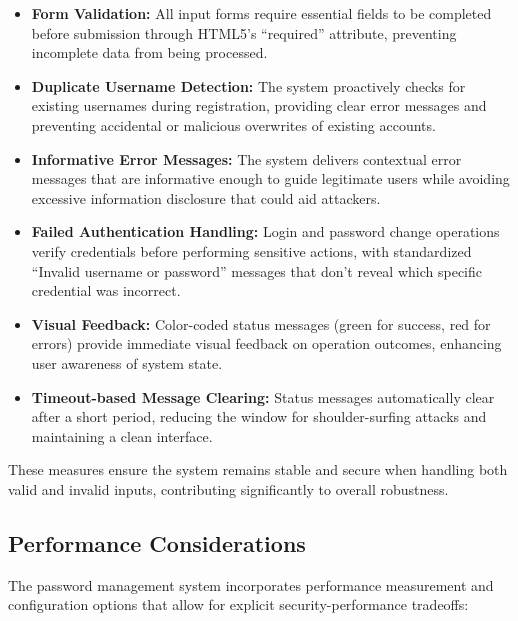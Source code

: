 \documentclass[11pt,a4paper]{article}
\begin{document}
\begin{itemize}
   \item \textbf{Form Validation:} All input forms require essential fields to be completed before submission through HTML5's ``required'' attribute, preventing incomplete data from being processed.
   
   \item \textbf{Duplicate Username Detection:} The system proactively checks for existing usernames during registration, providing clear error messages and preventing accidental or malicious overwrites of existing accounts.
   
   \item \textbf{Informative Error Messages:} The system delivers contextual error messages that are informative enough to guide legitimate users while avoiding excessive information disclosure that could aid attackers.
   
   \item \textbf{Failed Authentication Handling:} Login and password change operations verify credentials before performing sensitive actions, with standardized ``Invalid username or password'' messages that don't reveal which specific credential was incorrect.
   
   \item \textbf{Visual Feedback:} Color-coded status messages (green for success, red for errors) provide immediate visual feedback on operation outcomes, enhancing user awareness of system state.
   
   \item \textbf{Timeout-based Message Clearing:} Status messages automatically clear after a short period, reducing the window for shoulder-surfing attacks and maintaining a clean interface.
\end{itemize}

These measures ensure the system remains stable and secure when handling both valid and invalid inputs, contributing significantly to overall robustness.

\subsection{Performance Considerations}

The password management system incorporates performance measurement and configuration options that allow for explicit security-performance tradeoffs:
\end{document}
